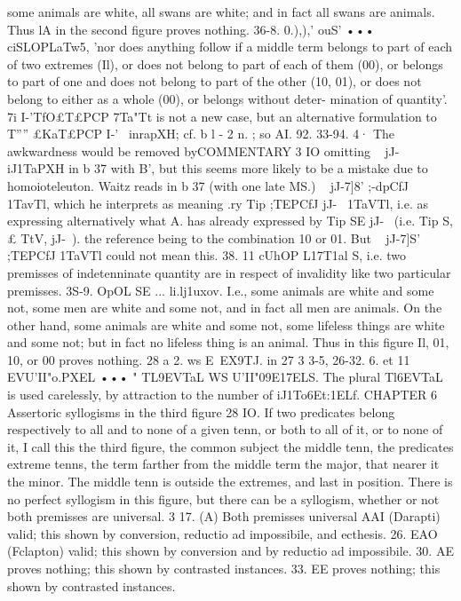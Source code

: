 {some animals are white, all swans are white; and in fact all
swans are animals. Thus lA in the second figure proves nothing.
36-8. 0.),),' ouS' ••• ciSLOPLaTw5, 'nor does anything follow if a
middle term belongs to part of each of two extremes (Il), or
does not belong to part of each of them (00), or belongs to part
of one and does not belong to part of the other (10, 01), or does
not belong to either as a whole (00), or belongs without deter-
mination of quantity'. 7i I-'TfO£T£PCP 7Ta"Tt is not a new case, but an
alternative formulation to T'''' £KaT£PCP I-'~ inrapXH; cf. b l - 2 n. ;
so AI. 92. 33-94. 4· The awkwardness would be removed byCOMMENTARY
3 IO
omitting ~ jJ-~ iJ1TaPXH in b 37 with B', but this seems more likely
to be a mistake due to homoioteleuton.
Waitz reads in b 37 (with one late MS.) ~ jJ-7]8' ;-dpCfJ 1TavTl, which
he interprets as meaning .ry Tip ;TEPCfJ jJ-~ 1TaVTl, i.e. as expressing
alternatively what A. has already expressed by Tip SE jJ-~ (i.e. Tip S,£
TtV, jJ-~). the reference being to the combination 10 or 01. But
~ jJ-7]S' ;TEPCfJ 1TaVTl could not mean this.
38. 11 cUhOP L17T1al S, i.e. two premisses of indetenninate quantity
are in respect of invalidity like two particular premisses.
3S-9. OpOL SE ... li.lj1uxov. I.e., some animals are white and
some not, some men are white and some not, and in fact all men
are animals. On the other hand, some animals are white and
some not, some lifeless things are white and some not; but in
fact no lifeless thing is an animal. Thus in this figure Il, 01, 10,
or 00 proves nothing.
28 a 2. ws E~EX9TJ. in 27 3 3-5, 26-32.
6. et 11 EVU'II"o.PXEL ••• " TL9EVTaL WS U'II"09E17ELS. The plural Tl6EVTaL
is used carelessly, by attraction to the number of iJ1To6Et:1ELf.
CHAPTER 6
Assertoric syllogisms in the third figure
28 IO. If two predicates belong respectively to all and to none
of a given tenn, or both to all of it, or to none of it, I call this the
third figure, the common subject the middle tenn, the predicates
extreme tenns, the term farther from the middle term the major,
that nearer it the minor. The middle tenn is outside the extremes,
and last in position. There is no perfect syllogism in this figure,
but there can be a syllogism, whether or not both premisses are
universal.
3
17.
(A) Both premisses universal
AAI (Darapti) valid; this shown by conversion, reductio ad
impossibile, and ecthesis.
26. EAO (Fclapton) valid; this shown by conversion and by
reductio ad impossibile.
30. AE proves nothing; this shown by contrasted instances.
33. EE proves nothing; this shown by contrasted instances.
}
